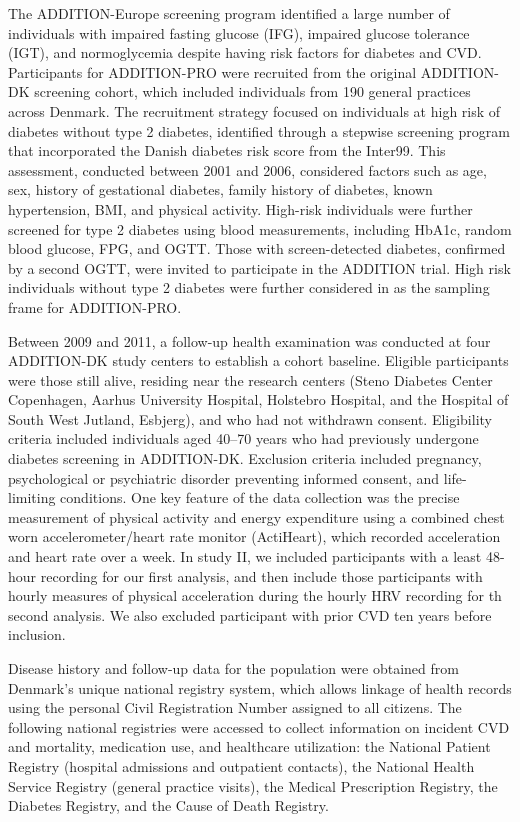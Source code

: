 \documentclass[
  a4paper,
  headsepline=true,
  open=any]{scrbook}
\begin{document}
The ADDITION-Europe screening program identified a large number of
individuals with impaired fasting glucose (IFG), impaired glucose
tolerance (IGT), and normoglycemia despite having risk factors for
diabetes and CVD. Participants for ADDITION-PRO were recruited from the
original ADDITION-DK screening cohort, which included individuals from
190 general practices across Denmark. The recruitment strategy focused
on individuals at high risk of diabetes without type 2 diabetes,
identified through a stepwise screening program that incorporated the
Danish diabetes risk score from the Inter99. This assessment, conducted
between 2001 and 2006, considered factors such as age, sex, history of
gestational diabetes, family history of diabetes, known hypertension,
BMI, and physical activity. High-risk individuals were further screened
for type 2 diabetes using blood measurements, including HbA1c, random
blood glucose, FPG, and OGTT. Those with screen-detected diabetes,
confirmed by a second OGTT, were invited to participate in the ADDITION
trial. High risk individuals without type 2 diabetes were further
considered in as the sampling frame for ADDITION-PRO.

Between 2009 and 2011, a follow-up health examination was conducted at
four ADDITION-DK study centers to establish a cohort baseline. Eligible
participants were those still alive, residing near the research centers
(Steno Diabetes Center Copenhagen, Aarhus University Hospital, Holstebro
Hospital, and the Hospital of South West Jutland, Esbjerg), and who had
not withdrawn consent. Eligibility criteria included individuals aged
40--70 years who had previously undergone diabetes screening in
ADDITION-DK. Exclusion criteria included pregnancy, psychological or
psychiatric disorder preventing informed consent, and life-limiting
conditions. One key feature of the data collection was the precise
measurement of physical activity and energy expenditure using a combined
chest worn accelerometer/heart rate monitor (ActiHeart), which recorded
acceleration and heart rate over a week. In study II, we included
participants with a least 48-hour recording for our first analysis, and
then include those participants with hourly measures of physical
acceleration during the hourly HRV recording for th second analysis. We
also excluded participant with prior CVD ten years before inclusion.

Disease history and follow-up data for the population were obtained from
Denmark's unique national registry system, which allows linkage of
health records using the personal Civil Registration Number assigned to
all citizens. The following national registries were accessed to collect
information on incident CVD and mortality, medication use, and
healthcare utilization: the National Patient Registry (hospital
admissions and outpatient contacts), the National Health Service
Registry (general practice visits), the Medical Prescription Registry,
the Diabetes Registry, and the Cause of Death Registry.
\end{document}

